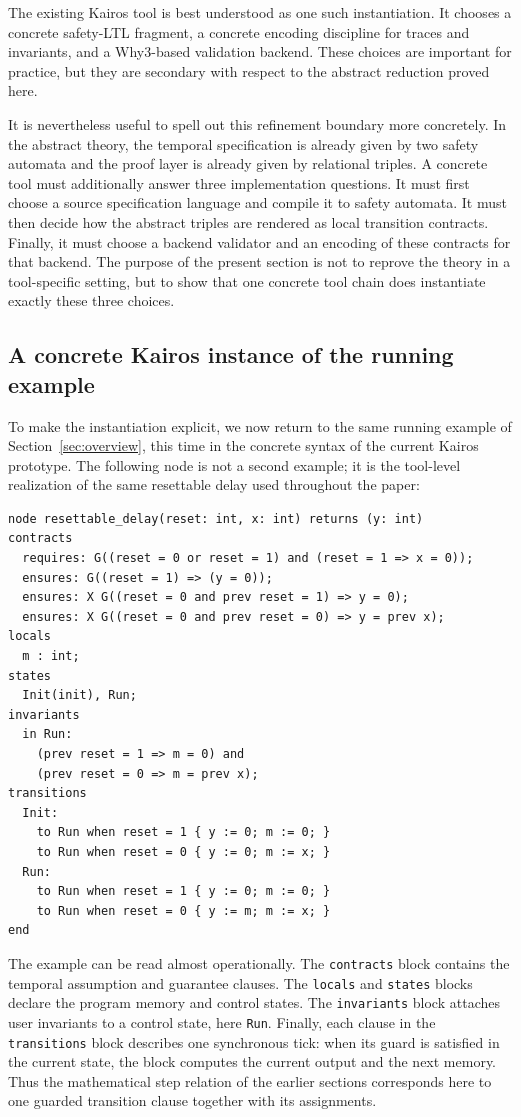 \documentclass[acmsmall,screen]{acmart}
\theoremstyle{leftplain}
\theoremstyle{leftdefinition}
\theoremstyle{leftremark}
\begin{document}
The existing Kairos tool is best understood as one such instantiation. It
chooses a concrete safety-LTL fragment, a concrete encoding discipline for
traces and invariants, and a Why3-based validation backend. These choices are
important for practice, but they are secondary with respect to the abstract
reduction proved here.

It is nevertheless useful to spell out this refinement boundary more
concretely. In the abstract theory, the temporal specification is already given
by two safety automata and the proof layer is already given by relational
triples. A concrete tool must additionally answer three implementation
questions. It must first choose a source specification language and compile it
to safety automata. It must then decide how the abstract triples are rendered
as local transition contracts. Finally, it must choose a backend validator and
an encoding of these contracts for that backend. The purpose of the present
section is not to reprove the theory in a tool-specific setting, but to show
that one concrete tool chain does instantiate exactly these three choices.

\subsection{A concrete Kairos instance of the running example}
To make the instantiation explicit, we now return to the same running example
of Section~\ref{sec:overview}, this time in the concrete syntax of the current
Kairos prototype. The following node is not a second example; it is the
tool-level realization of the same resettable delay used throughout the paper:

\begin{lstlisting}[style=kairosstyle]
node resettable_delay(reset: int, x: int) returns (y: int)
contracts
  requires: G((reset = 0 or reset = 1) and (reset = 1 => x = 0));
  ensures: G((reset = 1) => (y = 0));
  ensures: X G((reset = 0 and prev reset = 1) => y = 0);
  ensures: X G((reset = 0 and prev reset = 0) => y = prev x);
locals
  m : int;
states
  Init(init), Run;
invariants
  in Run:
    (prev reset = 1 => m = 0) and
    (prev reset = 0 => m = prev x);
transitions
  Init:
    to Run when reset = 1 { y := 0; m := 0; }
    to Run when reset = 0 { y := 0; m := x; }
  Run:
    to Run when reset = 1 { y := 0; m := 0; }
    to Run when reset = 0 { y := m; m := x; }
end
\end{lstlisting}

The example can be read almost operationally. The \lstinline|contracts| block
contains the temporal assumption and guarantee clauses. The \lstinline|locals|
and \lstinline|states| blocks declare the program memory and control states.
The \lstinline|invariants| block attaches user invariants to a control state,
here \lstinline|Run|. Finally, each clause in the \lstinline|transitions| block
describes one synchronous tick: when its guard is satisfied in the current
state, the block computes the current output and the next memory. Thus the
mathematical step relation of the earlier sections corresponds here to one
guarded transition clause together with its assignments.
\end{document}
